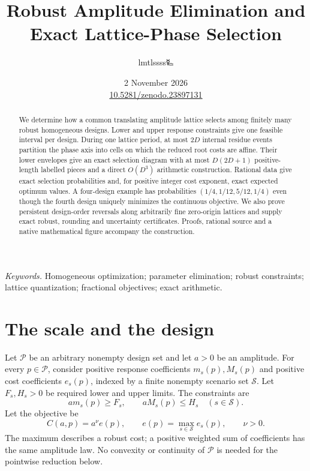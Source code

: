 \documentclass[11pt,a4paper]{article}
\title{\LARGE Robust Amplitude Elimination and\\Exact Lattice-Phase Selection}
\author{lmtlssss{\authorsymbol 🜐}}
\date{2 November 2026\\[3pt]\small\href{https://doi.org/10.5281/zenodo.23897131}{10.5281/zenodo.23897131}}
\begin{document}
\maketitle\thispagestyle{plain}

\begin{abstract}
We determine how a common translating amplitude lattice selects among
finitely many robust homogeneous designs. Lower and upper response
constraints give one feasible interval per design. During one lattice
period, at most $2D$ internal residue events partition the phase axis
into cells on which the reduced root costs are affine. Their lower
envelopes give an exact selection diagram with at most $D(2D+1)$
positive-length labelled pieces and a direct $O(D^3)$ arithmetic
construction. Rational data give exact selection probabilities and,
for positive integer cost exponent, exact expected optimum values.
A four-design example has probabilities $(1/4,1/12,5/12,1/4)$ even though
the fourth design uniquely minimizes the continuous objective.
We also prove persistent design-order reversals along arbitrarily fine
zero-origin lattices and supply exact robust, rounding and uncertainty
certificates. Proofs, rational source and a native mathematical figure
accompany the construction.
\end{abstract}
\noindent\textit{Keywords.} Homogeneous optimization; parameter elimination;
robust constraints; lattice quantization; fractional objectives; exact arithmetic.

\section{The scale and the design}
Let $\mathcal P$ be an arbitrary nonempty design set and let $a>0$ be an
amplitude. For every $p\in\mathcal P$, consider positive response coefficients
$m_s(p),M_s(p)$ and positive cost coefficients $e_s(p)$, indexed by a finite
nonempty scenario set $\mathcal S$. Let $F_s,H_s>0$ be required lower and
upper limits. The constraints are
\begin{equation}\label{eq:constraints}
 a m_s(p)\ge F_s,\qquad a M_s(p)\le H_s
 \quad(s\in\mathcal S).
\end{equation}
Let the objective be
\begin{equation}\label{eq:cost}
 C(a,p)=a^\nu e(p),\qquad
 e(p)=\max_{s\in\mathcal S}e_s(p),\qquad \nu>0.
\end{equation}
The maximum describes a robust cost; a positive weighted sum of coefficients
has the same amplitude law. No convexity or continuity of $\mathcal P$ is
needed for the pointwise reduction below.
\end{document}
